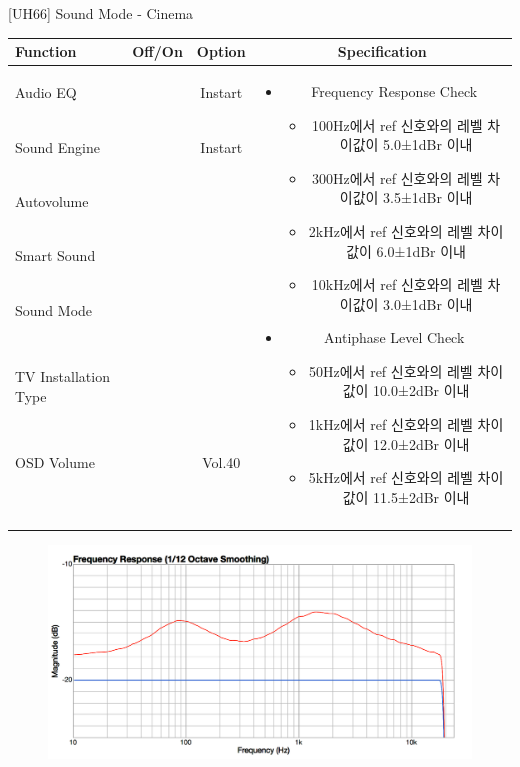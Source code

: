 \begin{frame}[t]{[UH66] Sound Mode - Cinema}
\begin{tiny}
\begin{tabular}{@{}lccc@{}}
\toprule
Function & Off/On & Option & Specification \\
\midrule
Audio EQ & \color{black}{Off} & Instart &
\multirow{10}{60mm}{
\begin{itemize}
\item Frequency Response Check
	\begin{itemize}
	\item 100Hz에서 ref 신호와의 레벨 차이값이 5.0±1dBr 이내
	\item 300Hz에서 ref 신호와의 레벨 차이값이 3.5±1dBr 이내
	\item 2kHz에서 ref 신호와의 레벨 차이값이 6.0±1dBr 이내
	\item 10kHz에서 ref 신호와의 레벨 차이값이 3.0±1dBr 이내
	\end{itemize}
\item Antiphase Level Check
	\begin{itemize}
	\item 50Hz에서 ref 신호와의 레벨 차이값이 10.0±2dBr 이내
	\item 1kHz에서 ref 신호와의 레벨 차이값이 12.0±2dBr 이내
	\item 5kHz에서 ref 신호와의 레벨 차이값이 11.5±2dBr 이내
	\end{itemize}
\end{itemize}
} \\
Sound Engine & \color{blue}{On} & Instart & \\
Autovolume & \color{black}{Off} & & \\
Smart Sound & \color{black}{Off} & & \\
Sound Mode & \color{blue}{On} & \color{blue}{Cinema} & \\
TV Installation Type & \color{blue}{On} & \color{black}{Standtype1} & \\
OSD Volume & \color{blue}{On} & Vol.40 & \\
& & & \\
& & & \\
& & & \\
& & & \\
\midrule
\end{tabular}
\end{tiny}

\begin{figure}[b]
\includegraphics[height=0.3\textwidth]{figures/cinema.png}
\end{figure}

\end{frame}
